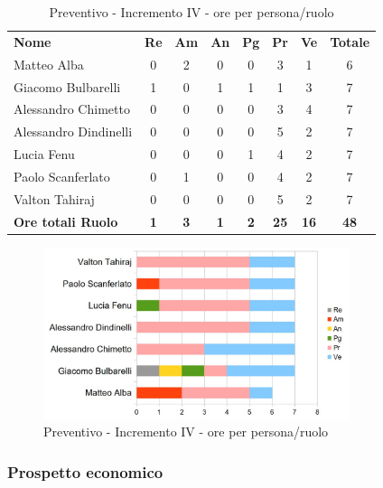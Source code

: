 \begin{table} [h!]
	\begin{center}
		\begin{tabular} { m{3.5cm} c c c c c c c }
			\rowcolor{lightgray}
			\textbf{Nome} & \textbf{Re} & \textbf{Am} & \textbf{An} & \textbf{Pg} & \textbf{Pr} & \textbf{Ve} & \textbf{Totale} \\
			Matteo Alba & 0 & 2 & 0 & 0 & 3 & 1 & 6 \\
			Giacomo Bulbarelli & 1 & 0 & 1 & 1 & 1 & 3 & 7 \\
			Alessandro Chimetto & 0 & 0 & 0 & 0 & 3 & 4 & 7 \\
			Alessandro Dindinelli & 0 & 0 & 0 & 0 & 5 & 2 & 7 \\
			Lucia Fenu & 0 & 0 & 0 & 1 & 4 & 2 & 7 \\
			Paolo Scanferlato & 0 & 1 & 0 & 0 & 4 & 2 & 7 \\
			Valton Tahiraj & 0 & 0 & 0 & 0 & 5 & 2 & 7 \\
			\textbf{Ore totali Ruolo} & \textbf{1} & \textbf{3} & \textbf{1} & \textbf{2} & \textbf{25}& \textbf{16} & \textbf{48}
		\end{tabular}
		\caption{Preventivo - Incremento IV - ore per persona/ruolo}
	\end{center}
\end{table}
\begin{figure} [h!]
	\centering
	\includegraphics[width=0.8\textwidth]{res/img/grafici/Incremento4Ore.jpg}
	\caption{Preventivo - Incremento IV - ore per persona/ruolo} 
\end{figure}

\newpage
\subsubsection{Prospetto economico}

